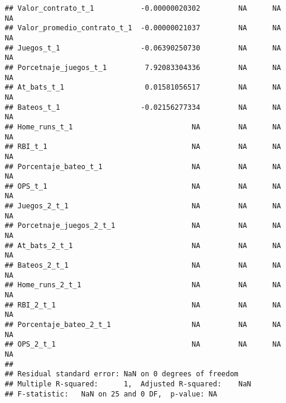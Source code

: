 \documentclass[
]{article}
\begin{document}
\begin{verbatim}
## Valor_contrato_t_1           -0.00000020302         NA      NA       NA
## Valor_promedio_contrato_t_1  -0.00000021037         NA      NA       NA
## Juegos_t_1                   -0.06390250730         NA      NA       NA
## Porcetnaje_juegos_t_1         7.92083304336         NA      NA       NA
## At_bats_t_1                   0.01581056517         NA      NA       NA
## Bateos_t_1                   -0.02156277334         NA      NA       NA
## Home_runs_t_1                            NA         NA      NA       NA
## RBI_t_1                                  NA         NA      NA       NA
## Porcentaje_bateo_t_1                     NA         NA      NA       NA
## OPS_t_1                                  NA         NA      NA       NA
## Juegos_2_t_1                             NA         NA      NA       NA
## Porcetnaje_juegos_2_t_1                  NA         NA      NA       NA
## At_bats_2_t_1                            NA         NA      NA       NA
## Bateos_2_t_1                             NA         NA      NA       NA
## Home_runs_2_t_1                          NA         NA      NA       NA
## RBI_2_t_1                                NA         NA      NA       NA
## Porcentaje_bateo_2_t_1                   NA         NA      NA       NA
## OPS_2_t_1                                NA         NA      NA       NA
## 
## Residual standard error: NaN on 0 degrees of freedom
## Multiple R-squared:      1,  Adjusted R-squared:    NaN 
## F-statistic:   NaN on 25 and 0 DF,  p-value: NA
\end{verbatim}
\end{document}
